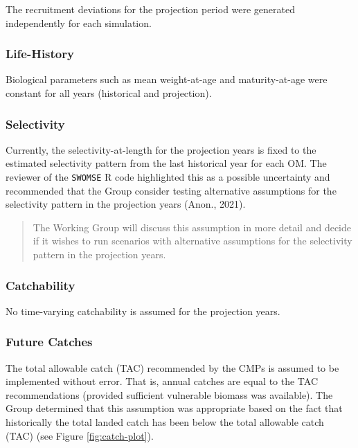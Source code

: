 \documentclass[
]{article}
\begin{document}
The recruitment deviations for the projection period were generated independently for each simulation.

\hypertarget{life-history}{%
\subsubsection{Life-History}\label{life-history}}

Biological parameters such as mean weight-at-age and maturity-at-age were constant for all years (historical and projection).

\hypertarget{selectivity-1}{%
\subsubsection{Selectivity}\label{selectivity-1}}

Currently, the selectivity-at-length for the projection years is fixed to the estimated selectivity pattern from the last historical year for each OM. The reviewer of the \texttt{SWOMSE} R code highlighted this as a possible uncertainty and recommended that the Group consider testing alternative assumptions for the selectivity pattern in the projection years (Anon., 2021).

\begin{quote}
The Working Group will discuss this assumption in more detail and decide if it wishes to run scenarios with alternative assumptions for the selectivity pattern in the projection years.
\end{quote}

\hypertarget{catchability}{%
\subsubsection{Catchability}\label{catchability}}

No time-varying catchability is assumed for the projection years.

\hypertarget{future-catches}{%
\subsubsection{Future Catches}\label{future-catches}}

The total allowable catch (TAC) recommended by the CMPs is assumed to be implemented without error. That is, annual catches are equal to the TAC recommendations (provided sufficient vulnerable biomass was available). The Group determined that this assumption was appropriate based on the fact that historically the total landed catch has been below the total allowable catch (TAC) (see Figure \ref{fig:catch-plot}).
\end{document}
